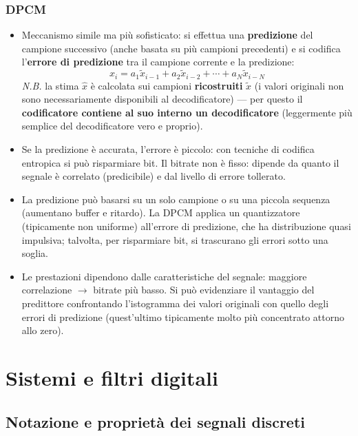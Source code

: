 \documentclass[12pt, a4paper]{article}
\begin{document}
\subsubsection{DPCM}
\begin{itemize}
    \item Meccanismo simile ma più sofisticato: si effettua una \textbf{predizione} del campione successivo (anche basata su più campioni precedenti) e si codifica l'\textbf{errore di predizione} tra il campione corrente e la predizione:
    $$\hat x_i = a_1\tilde x_{i-1} + a_2\tilde x_{i-2} + \cdots + a_N\tilde x_{i-N}$$
    \textit{N.B.} la stima $\hat x$ è calcolata sui campioni \textbf{ricostruiti} $\tilde x$ (i valori originali non sono necessariamente disponibili al decodificatore) — per questo il \textbf{codificatore contiene al suo interno un decodificatore} (leggermente più semplice del decodificatore vero e proprio).
    \item Se la predizione è accurata, l'errore è piccolo: con tecniche di codifica entropica si può risparmiare bit. Il bitrate non è fisso: dipende da quanto il segnale è correlato (predicibile) e dal livello di errore tollerato.
    \item La predizione può basarsi su un solo campione o su una piccola sequenza (aumentano buffer e ritardo). La DPCM applica un quantizzatore (tipicamente non uniforme) all'errore di predizione, che ha distribuzione quasi impulsiva; talvolta, per risparmiare bit, si trascurano gli errori sotto una soglia.
    \item Le prestazioni dipendono dalle caratteristiche del segnale: maggiore correlazione $\to$ bitrate più basso. Si può evidenziare il vantaggio del predittore confrontando l'istogramma dei valori originali con quello degli errori di predizione (quest'ultimo tipicamente molto più concentrato attorno allo zero).
\end{itemize}

\section{Sistemi e filtri digitali}

\subsection{Notazione e proprietà dei segnali discreti}
\end{document}
